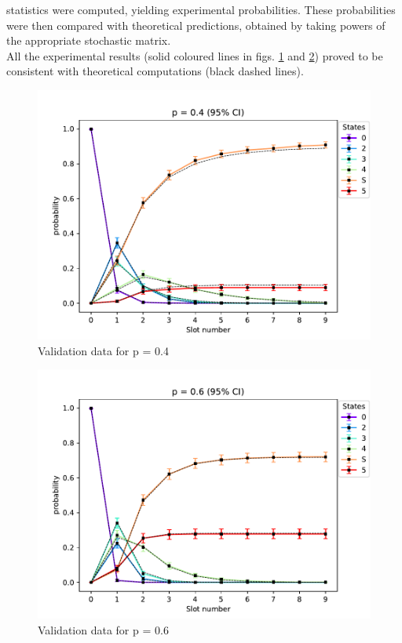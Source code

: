 statistics were computed, yielding experimental probabilities. These
probabilities were then compared with theoretical predictions, obtained by
taking powers of the appropriate stochastic matrix.\\
All the experimental results (solid coloured lines in figs.
\ref{fig:5to1validPlot1} and \ref{fig:5to1validPlot2}) proved to be consistent
with theoretical computations (black dashed lines).
\begin{figure}[H]
    \begin{center}
        \includegraphics[scale=0.7]{img/star5to1p=0.4validation.pdf}
        \caption{Validation data for p = 0.4}
        \label{fig:5to1validPlot1}
    \end{center}
    \vspace*{-0.8cm}
\end{figure}
\begin{figure}[H]
    \begin{center}
        \includegraphics[scale=0.7]{img/star5to1p=0.6validation.pdf}
        \caption{Validation data for p = 0.6}
        \label{fig:5to1validPlot2}
    \end{center}
    \vspace*{-0.8cm}
\end{figure}

